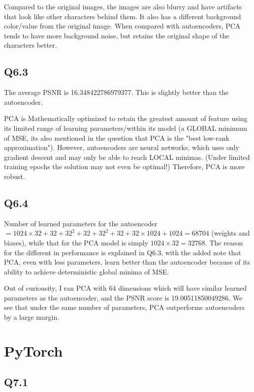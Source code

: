 \documentclass{article} %
\begin{document}
    Compared to the original images, the images are also blurry and have artifacts that look like other characters behind them. It also has a different background color/value from the original image. When compared with autoencoders, PCA tends to have more background noise, but retains the original shape of the characters better.

    \subsection*{Q6.3}

    The average PSNR is 16.348422786979377. This is slightly better than the autoencoder. 
    \medskip
    
    PCA is Mathematically optimized to retain the greatest amount of feature using its limited range of learning parameters/within its model (a GLOBAL minimum of MSE, its also mentioned in the question that PCA is the "best low-rank approximation"). However, autoencoders are neural networks, which uses only gradient descent and may only be able to reach LOCAL minimas. (Under limited training epochs the solution may not even be optimal!) Therefore, PCA is more robust.

    \subsection*{Q6.4}

    Number of learned parameters for the autoencoder $=1024\times32+32+32^2+32+32^2+32+32\times1024+1024=68704$ (weights and biases), while that for the PCA model is simply $1024\times32=32768$. The reason for the different in performance is explained in Q6.3, with the added note that PCA, even with less parameters, learn better than the autoencoder because of its ability to achieve deterministic global minima of MSE.
    \medskip
    
    Out of curiousity, I ran PCA with 64 dimensions which will have similar learned parameters as the autoencoder, and the PSNR score is 19.00511850049286. We see that under the same number of parameters, PCA outperforms autoencoders by a large margin.

    \section{PyTorch}
    \subsection*{Q7.1}
\end{document}
